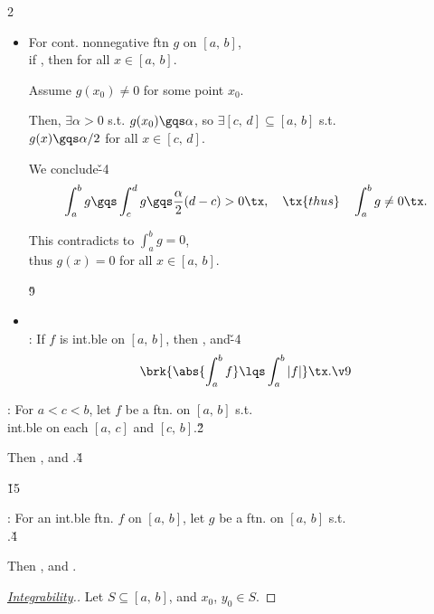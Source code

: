 \documentclass[dvipdfmx,a4paper,titlepage,9pt]{jsarticle}
\begin{document}
\begin{multicols*}{2}
\begin{itemize}[label={-}]
\item For cont. nonnegative ftn $g$ on $[a,\,b]$,\\
if , then  for all $x\in[a,\,b]$.

\begin{Pfbox}
Assume $g(x_0)\neq0$ for some point $x_0$.

Then, $\exists\alpha>0$ s.t. $g(x_0)\gqs\alpha$, so $\exists[c,\,d]\subseteq[a,\,b]$ s.t.\\
$g(x)\gqs\alpha/2$ for all $x\in[c,\,d]$.

We conclude\v{-4}
$$\int_a^bg\gqs\int_c^dg\gqs\frac\alpha2(d-c)>0\tx,\quad\tx{thus}\quad \int_a^bg\neq0\tx.$$

This contradicts to $\int_a^bg=0$,\\
thus $g(x)=0$ for all $x\in[a,\,b]$.
\end{Pfbox}\v9

\item{}\\
: If $f$ is int.ble on $[a,\,b]$, then , and\v{-4}
$$\brk{\abs{\int_a^bf}\lqs\int_a^b|f|}\tx.\v9$$
\end{itemize}


: For $a<c<b$, let $f$ be a ftn. on $[a,\,b]$ s.t.\\
\quad\;\;int.ble on each $[a,\,c]$ and $[c,\,b]$.\v2

\;\;Then , and .\v4

\hfill{}\v{15}


: For an int.ble ftn. $f$ on $[a,\,b]$, let $g$ be a ftn. on $[a,\,b]$ s.t.\\
\quad\;\;.\v4

\;\;Then , and .

\newpage

\begin{pfbox}
\begin{proof}[\color{TGreen}\ul{Integrability}.]\rnc{\qedsymbol}{\Sq}
Let $S\subseteq[a,\,b]$, and $x_0$, $y_0\in S$.


\end{proof}
\end{pfbox}
\end{multicols*}
\end{document}
